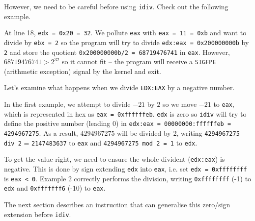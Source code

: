 \documentclass[a4paper]{article}
\begin{document}
However, we need to be careful before using \texttt{idiv}. Check out the following example.

At line 18, \texttt{edx = 0x20 = 32}. We pollute \texttt{eax} with \texttt{eax = 11 = 0xb} and want to divide by \texttt{ebx = 2}  so the program will try to divide \texttt{edx:eax = 0x200000000b} by \texttt{2} and store the quotient \texttt{0x200000000b/2 = 68719476741} in \texttt{eax}. However, $68719476741 > 2^{32}$ so it cannot fit -- the program will receive a \texttt{SIGFPE} (arithmetic exception) signal by the kernel and exit.




%
Let's examine what happens when we divide \texttt{EDX:EAX} by a negative number. 



In the first example, we attempt to divide $-21$ by $2$ so we move $-21$ to \texttt{eax}, which is represented in hex as \texttt{eax = 0xffffffeb}. \texttt{edx} is zero so \texttt{idiv} will try to define the positive number (leading 0) in \texttt{edx:eax = 00000000:ffffffeb = 4294967275}. As a result, $4294967275$ will be divided by 2, writing \texttt{4294967275 div 2} = \texttt{2147483637} to \texttt{eax} and \texttt{4294967275 mod 2 = 1} to \texttt{edx}.

To get the value right, we need to ensure the whole divident (\texttt{edx:eax}) is negative. This is done by sign extending \texttt{edx} into \texttt{eax}, i.e. set \texttt{edx = 0xffffffff} is \texttt{eax < 0}. Example 2 correctly performs the division, writing \texttt{0xffffffff} (-1) to \texttt{edx} and \texttt{0xfffffff6} (-10) to \texttt{eax}. 

The next section describes an instruction that can generalise this zero/sign extension before \texttt{idiv}.


\end{document}
